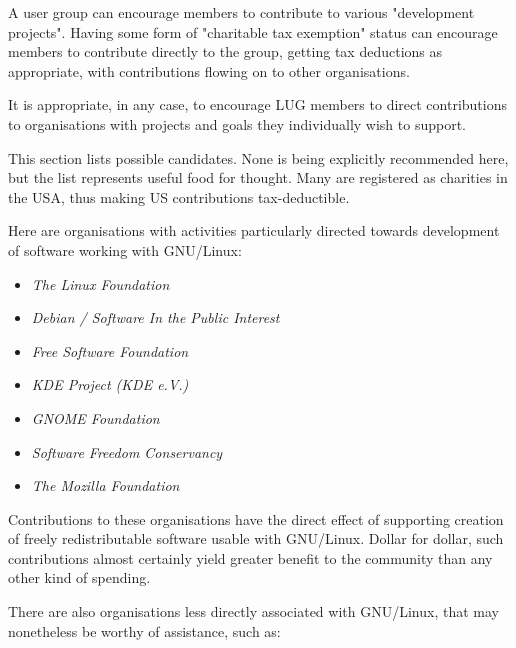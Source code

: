  
A user group can encourage members to contribute to various
"development projects". Having some form of "charitable tax exemption"
status can encourage members to contribute directly to the group,
getting tax deductions as appropriate, with contributions flowing on to
other organisations.



 
It is appropriate, in any case, to encourage LUG members to direct
contributions to organisations with projects and goals they
individually wish to support.



 
This section lists possible candidates. None is being explicitly 
recommended here, but the list represents useful food for
thought.  Many are registered as charities in the USA, thus
making US contributions tax-deductible.



Here are organisations with activities particularly directed towards
development of software working with GNU/Linux:

\begin{itemize}
\item 
\emph{The Linux Foundation} \texttt{\adhurl}
\item 
\emph{Debian / Software In the Public Interest} \texttt{\adiurl}
\item 
\emph{Free Software Foundation} \texttt{\adjurl}
 
\item 
\emph{KDE Project (KDE e.V.)} \texttt{\adkurl}
\item 
\emph{GNOME Foundation} \texttt{\adlurl}
\item 
\emph{Software Freedom Conservancy} \texttt{\admurl}
\item 
\emph{The Mozilla Foundation} \texttt{\adnurl}
\end{itemize}




Contributions to these organisations have the direct effect of
supporting creation of freely redistributable software usable with
GNU/Linux.  Dollar for dollar, such contributions almost certainly yield
greater benefit to the community than any other kind of spending.



 
There are also organisations less directly associated with GNU/Linux, that
may nonetheless be worthy of assistance, such as:

